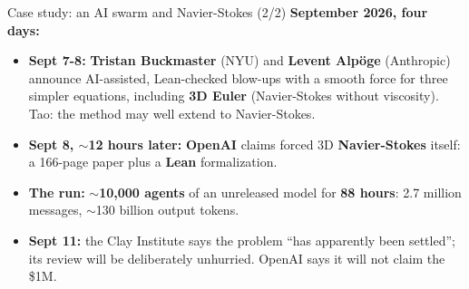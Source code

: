\documentclass[aspectratio=43]{beamer}
\begin{document}
\begin{frame}{Case study: an AI swarm and Navier-Stokes (2/2)}
  \textbf{September 2026, four days:}
  \begin{itemize}\small
    \item \textbf{Sept 7-8:} \textbf{Tristan Buckmaster} (NYU) and \textbf{Levent Alp\"oge}
      (Anthropic) announce AI-assisted, Lean-checked blow-ups with a smooth force for three
      simpler equations, including \textbf{3D Euler} (Navier-Stokes without viscosity). Tao:
      the method may well extend to Navier-Stokes.
    \item \textbf{Sept 8, $\sim$12 hours later:} \textbf{OpenAI} claims forced 3D
      \textbf{Navier-Stokes} itself: a 166-page paper plus a \textbf{Lean} formalization.
    \item \textbf{The run:} $\sim$\textbf{10{,}000 agents} of an unreleased model for
      \textbf{88 hours}: 2.7 million messages, $\sim$130 billion output tokens.
    \item \textbf{Sept 11:} the Clay Institute says the problem ``has apparently been
      settled''; its review will be deliberately unhurried. OpenAI says it will not claim the
      \$1M.
  \end{itemize}
  \vfill
\end{frame}
\end{document}
